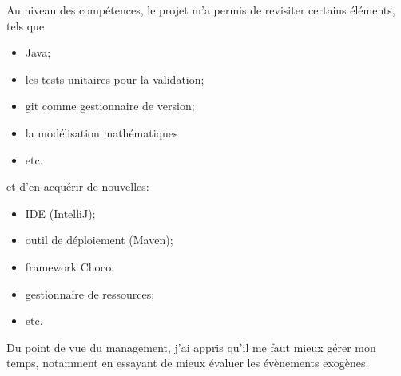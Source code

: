 \documentclass[a4paper]{article}
\begin{document}
Au niveau des compétences, le projet m'a permis de revisiter
certains éléments, tels que 
\begin{itemize}
	\item Java;
	\item les tests unitaires pour la validation;
	\item git comme gestionnaire de version;
	\item la modélisation mathématiques
	\item etc.
\end{itemize}
et d'en acquérir de nouvelles:
\begin{itemize}
	\item IDE (IntelliJ);
	\item outil de déploiement (Maven);
	\item framework Choco;
	\item gestionnaire de ressources;
	\item etc.
\end{itemize}

Du point de vue du management, j'ai appris qu'il me faut mieux gérer
mon temps, notamment en essayant de mieux évaluer les évènements exogènes.
\end{document}
